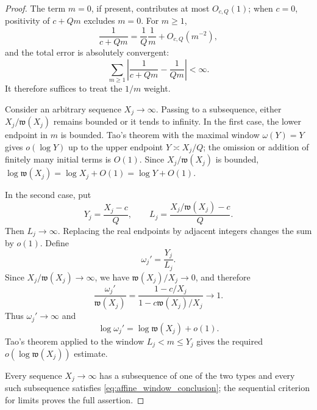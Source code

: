 \documentclass[11pt]{amsart}
\numberwithin{equation}{section}
\theoremstyle{plain}
\theoremstyle{definition}
\theoremstyle{remark}
\newcommand{\what}{\mathfrak w}
\begin{document}
\begin{proof}
The term $m=0$, if present, contributes at most $O_{c,Q}(1)$; when $c=0$, positivity of $c+Qm$ excludes $m=0$.  For $m\ge1$,
\begin{equation}
\frac1{c+Qm}=\frac1Q\frac1m+O_{c,Q}(m^{-2}),
\label{eq:weight_affine_expansion}
\end{equation}
and the total error is absolutely convergent:
\begin{equation}
\sum_{m\ge1}\left|\frac1{c+Qm}-\frac1{Qm}\right|<\infty.
\label{eq:weight_affine_error_sum}
\end{equation}
It therefore suffices to treat the $1/m$ weight.

Consider an arbitrary sequence $X_j\to\infty$.  Passing to a subsequence, either $X_j/\what(X_j)$ remains bounded or it tends to infinity.  In the first case, the lower endpoint in $m$ is bounded.  Tao's theorem with the maximal window $\omega(Y)=Y$ gives $o(\log Y)$ up to the upper endpoint $Y\asymp X_j/Q$; the omission or addition of finitely many initial terms is $O(1)$.  Since $X_j/\what(X_j)$ is bounded, $\log\what(X_j)=\log X_j+O(1)=\log Y+O(1)$.

In the second case, put
\begin{equation}
Y_j=\frac{X_j-c}{Q},
\qquad
L_j=\frac{X_j/\what(X_j)-c}{Q}.
\label{eq:Y_L_affine_window}
\end{equation}
Then $L_j\to\infty$.  Replacing the real endpoints by adjacent integers changes the sum by $o(1)$.  Define
\begin{equation}
\omega_j'=\frac{Y_j}{L_j}.
\label{eq:omega_prime}
\end{equation}
Since $X_j/\what(X_j)\to\infty$, we have $\what(X_j)/X_j\to0$, and therefore
\begin{equation}
\frac{\omega_j'}{\what(X_j)}
=\frac{1-c/X_j}{1-c\what(X_j)/X_j}
\longrightarrow1.
\label{eq:omega_prime_asymptotic}
\end{equation}
Thus $\omega_j'\to\infty$ and
\begin{equation}
\log\omega_j'=\log\what(X_j)+o(1).
\label{eq:log_omega_prime}
\end{equation}
Tao's theorem applied to the window $L_j<m\le Y_j$ gives the required $o(\log\what(X_j))$ estimate.

Every sequence $X_j\to\infty$ has a subsequence of one of the two types and every such subsequence satisfies \eqref{eq:affine_window_conclusion}; the sequential criterion for limits proves the full assertion.
\end{proof}
\end{document}
